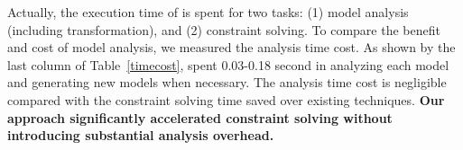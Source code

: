 Actually, the execution time of \tool is spent for two tasks: (1) model analysis (including transformation), and (2) constraint solving. To compare the benefit and cost of model analysis, we measured the analysis time cost. 
As shown by the last column of Table~\ref{timecost}, \tool spent 0.03-0.18 second in analyzing each model and generating new models when necessary. The analysis time cost is negligible compared with the constraint solving time \tool saved over existing techniques. \textbf{Our approach significantly accelerated constraint solving without introducing substantial analysis overhead.}    
	

